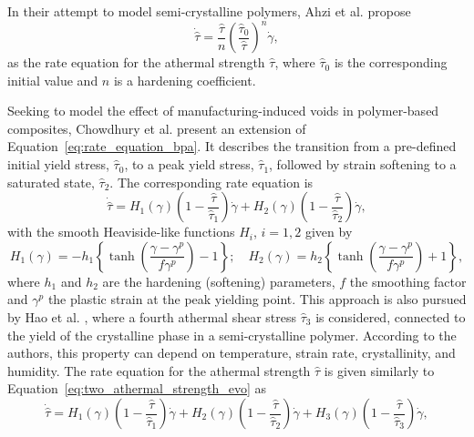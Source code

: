 In their attempt to model semi-crystalline polymers, Ahzi et al. \citep{ahziModelingDeformationBehavior2003} propose
\begin{equation}
  \label{eq:rate_equation_power}
  \dot{\hat \tau} =  \frac{\hat \tau}{n}\left(\frac{\hat\tau_0}{\hat\tau}\right)^n\dot \gamma,
\end{equation}
as the rate equation for the athermal strength $\hat\tau$, where $\hat\tau_0$ is the corresponding initial value and $n$ is a hardening coefficient.

Seeking to model the effect of manufacturing-induced voids in polymer-based composites, Chowdhury et al. \citep{chowdhuryEffectsManufacturingInducedVoids2008} present an extension of Equation~\eqref{eq:rate_equation_bpa}.
It describes the transition from a pre-defined initial yield stress, $\hat\tau_0$, to a peak yield stress, $\hat\tau_1$, followed by strain softening to a saturated state, $\hat\tau_2$.
The corresponding rate equation is
\begin{equation}
	\label{eq:two_athermal_strength_evo}
	\dot{\hat\tau}=H_1(\gamma)\left(1-\frac{\hat\tau}{\hat\tau_1}\right) \dot{\gamma}+H_2(\gamma)\left(1-\frac{\hat\tau}{\hat\tau_2}\right)\dot{\gamma},
\end{equation}
with the smooth Heaviside-like functions $H_i$, $i=1,2$ given by
\begin{equation}
	H_1(\gamma)=-h_1\left\{\tanh \left(\frac{\gamma-\gamma^p}{f \gamma^p}\right)-1\right\} ; \quad H_2(\gamma)=h_2\left\{\tanh \left(\frac{\gamma-\gamma^p}{f \gamma^p}\right)+1\right\},
\end{equation}
where $h_1$ and $h_2$ are the hardening (softening) parameters, $f$ the smoothing factor and $\gamma^p$ the plastic strain at the peak yielding point.
This approach is also pursued by Hao et al. \citep{haoUnifiedAmorphousCrystalline2022}, where a fourth athermal shear stress $\hat \tau_3$ is considered, connected to the yield of the crystalline phase in a semi-crystalline polymer.
According to the authors, this property can depend on temperature, strain rate, crystallinity, and humidity.
The rate equation for the athermal strength $\hat\tau$ is given similarly to Equation~\eqref{eq:two_athermal_strength_evo} as
\begin{equation}
  \label{eq:rate_equation_hao}
	\dot{\hat\tau}=H_1(\gamma) \left(1-\frac{\hat\tau}{\hat\tau_1}\right)  \dot{\gamma}+H_2(\gamma) \left(1-\frac{\hat\tau}{\hat\tau_2}\right)  \dot{\gamma}+H_3(\gamma) \left(1-\frac{\hat\tau}{\hat\tau_3}\right)  \dot{\gamma},
\end{equation}
